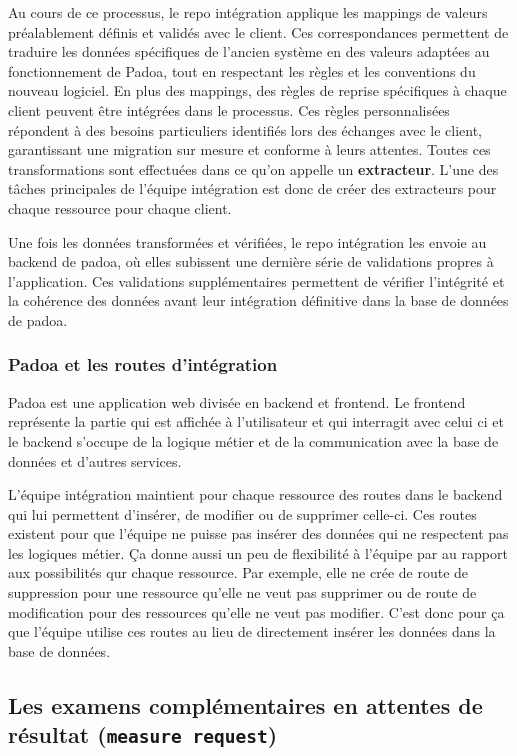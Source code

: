 Au cours de ce processus, le repo intégration applique les mappings de valeurs préalablement définis et validés avec le client. Ces correspondances permettent de traduire les données spécifiques de l’ancien système en des valeurs adaptées au fonctionnement de Padoa, tout en respectant les règles et les conventions du nouveau logiciel. En plus des mappings, des règles de reprise spécifiques à chaque client peuvent être intégrées dans le processus. Ces règles personnalisées répondent à des besoins particuliers identifiés lors des échanges avec le client, garantissant une migration sur mesure et conforme à leurs attentes.
Toutes ces transformations sont effectuées dans ce qu'on appelle un \textbf{extracteur}. L'une des tâches principales de l'équipe intégration est donc de créer des extracteurs pour chaque ressource pour chaque client.

Une fois les données transformées et vérifiées, le repo intégration les envoie au backend de padoa, où elles subissent une dernière série de validations propres à l’application. Ces validations supplémentaires permettent de vérifier l’intégrité et la cohérence des données avant leur intégration définitive dans la base de données de padoa. 

\subsubsection{Padoa et les routes d'intégration}

Padoa est une application web divisée en backend et frontend. Le frontend représente la partie qui est affichée à l'utilisateur et qui interragit avec celui ci et le backend s'occupe de la logique métier et de la communication avec la base de données et d'autres services.

L'équipe intégration maintient pour chaque ressource des routes dans le backend qui lui permettent d'insérer, de modifier ou de supprimer celle-ci. Ces routes existent pour que l'équipe ne puisse pas insérer des données qui ne respectent pas les logiques métier. Ça donne aussi un peu de flexibilité à l'équipe par au rapport aux possibilités qur chaque ressource. Par exemple, elle ne crée de route de suppression pour une ressource qu'elle ne veut pas supprimer ou de route de modification pour des ressources qu'elle ne veut pas modifier. C'est donc pour ça que l'équipe utilise ces routes au lieu de directement insérer les données dans la base de données.

\subsection{Les examens complémentaires en attentes de résultat (\texttt{measure request})}

